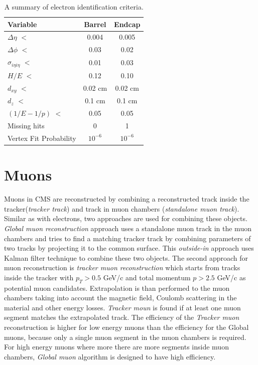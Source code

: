  \begin{table}[h]
\centering
  \caption{A summary of electron identification criteria.}
  \label{tab:eleID}
  \begin{tabular}{ l  c c}
      \hline
      \hline
      	Variable & Barrel & Endcap \\
      	\hline
    		$\Delta\eta$ $<$ &  0.004 & 0.005 \\
     	$\Delta\phi$ $<$ &  0.03 & 0.02 \\
     	$\sigma_{i\eta i\eta}$ $<$ & 0.01 & 0.03 \\
		$H/E$ $<$ & 0.12 & 0.10 \\
		$d_{xy}$ $<$ & 0.02 cm & 0.02 cm \\
		$d_{z}$ $<$  & 0.1 cm & 0.1 cm \\
		$(1/E - 1/p)$ $<$ & 0.05 & 0.05\\
		Missing hits  & 0 & 1 \\
		Vertex Fit Probability & $10^{-6}$ & $10^{-6}$ \\    	

      \hline
      \hline 
  \end{tabular}
\end{table}



\section{Muons}

Muons in CMS are reconstructed by combining a reconstructed track inside the tracker(\textit{tracker track}) and track in muon chambers (\textit{standalone muon track}). Similar as with electrons, two approaches are used for combining these objects. \textit{Global muon reconstruction} approach uses a standalone muon track in the muon chambers and tries to find a matching tracker track by combining parameters of two tracks by projecting it to the common surface. This \textit{outside-in} approach uses Kalman filter technique \cite{Fruhwirth1987444} to combine these two objects. The second approach for muon reconstruction is \textit{tracker muon reconstruction} which starts from tracks inside the tracker with $p_T>0.5$ GeV/c and total momentum $p>2.5$ GeV/c as potential muon candidates. Extrapolation is than performed to the muon chambers taking into account the magnetic field, Coulomb scattering in the material and other energy losses. \textit{Tracker moun} is found if at least one muon segment matches the extrapolated track. The efficiency of the \textit{Tracker muon} reconstruction is higher for low energy muons than the efficiency for the Global muons, because only a single muon segment in the muon chambers is required. For high energy muons where more there are more segments inside muon chambers, \textit{Global muon} algorithm is designed to have high efficiency.    

